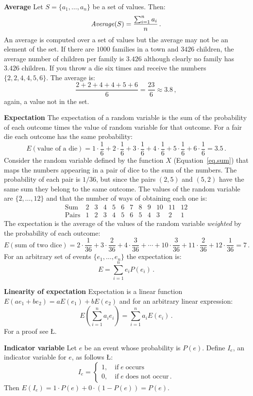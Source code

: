 \textbf{Average}
Let $S=\{a_1,\ldots,a_n\}$ be a set of values. Then:
\[
\mathit{Average}(S)=\displaystyle\frac{\sum_{i=1}^{n} a_i}{n}\,.
\]
An average is computed over a set of values but the average may not be an element of the set. If there are $1000$ families in a town and $3426$ children, the average number of children per family is $3.426$ although clearly no family has $3.426$ children. If you throw a die six times and receive the numbers $\{2,2,4,4,5,6\}$. The average is:
\[
\frac{2+2+4+4+5+6}{6}=\frac{23}{6}\approx 3.8\,,
\]
again, a value not in the set.

\textbf{Expectation}
The expectation of a random variable is the sum of the probability of each outcome times the value of random variable for that outcome. For a fair die each outcome has the same probability:
\[
E(\textrm{value of a die})=1\cdot \frac{1}{6} + 2\cdot\frac{1}{6} + 3\cdot\frac{1}{6} + 4\cdot\frac{1}{6} + 5\cdot\frac{1}{6} + 6\cdot\frac{1}{6}=3.5\,.
\]
Consider the random variable defined by the function $X$ (Equation~\ref{eq.sum}) that maps the numbers appearing in a pair of dice to the sum of the numbers. The probability of each pair is $1/36$, but since the pairs $(2,5)$ and $(5,2)$ have the same sum they belong to the same outcome. The values of the random variable are $\{2,\ldots,12\}$ and that the number of ways of obtaining each one is:
\[
\begin{array}{l|rrrrrrrrrrr}
\textrm{Sum} & 2 & 3 & 4 & 5 & 6 & 7 & 8 & 9 & 10 & 11 & 12\\\hline
\textrm{Pairs} & 1 & 2 & 3 & 4 & 5 & 6 & 5 & 4 & 3 & 2 & 1
\end{array}
\]
The expectation is the average of the values of the random variable \emph{weighted} by the probability of each outcome:
\[
E(\textrm{sum of two dice})=2\cdot \frac{1}{36} + 3\cdot \frac{2}{36} + 4\cdot \frac{3}{36} + 
\cdots + 10\cdot \frac{3}{36} + 11\cdot \frac{2}{36} + 12\cdot \frac{1}{36} = 7\,.
\]
For an arbitrary set of events $\{e_1,\ldots,e_n\}$ the expectation is:
\[
E=\sum_{i=1}^{n} e_iP(e_i)\,.
\]

\textbf{Linearity of expectation}\label{p.linearity}
Expectation is a linear function $E(ae_1 + be_2) = aE(e_1) + bE(e_2)$ and for an arbitrary linear expression:
\[
E\left(\sum_{i=1}^{n} a_ie_i\right)=\sum_{i=1}^{n} a_iE(e_i)\,.
\]
For a proof see \L{\cite[Section~4.9]{ross}}.

\textbf{Indicator variable} Let $e$ be an event whose probability is $P(e)$. Define $I_e$, an indicator variable for $e$, as follows \L{\cite[Chapter~4, Example~3b]{ross}}:
\[
I_e=
\left\{
\begin{array}{ll}
1,\quad \textrm{if}\; e\;\textrm{occurs}\\
0, \quad \textrm{if}\;e\;\textrm{does not occur}\,.
\end{array}
\right.
\]
Then $E(I_e)=1\cdot P(e) + 0\cdot (1-P(e))=P(e)$.


